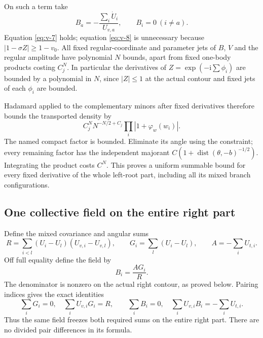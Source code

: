 \documentclass[11pt]{article}
\numberwithin{equation}{section}
\theoremstyle{remark}\newtheorem{remark}[theorem]{Remark}
\newcommand{\ii}{\mathrm i}
\begin{document}
On such a term take
\begin{equation}\label{eq:v-10}
B_a=-\frac{\sum_i\dot U_i}{U_{v,a}},\qquad B_i=0\ (i\ne a).
\end{equation}
Equation \eqref{eq:v-7} holds; equation \eqref{eq:v-8} is unnecessary because
$|1-\sigma Z|\ge1-v_0$. All fixed regular-coordinate and parameter jets of
$B$, $V$ and the regular amplitude have polynomial $N$ bounds, apart
from fixed one-body products costing $C_j^N$. In particular the
derivatives of $Z=\exp(-\ii\sum\phi_i)$ are bounded by a polynomial
in $N$, since $|Z|\le1$ at the actual contour and fixed jets of each
$\phi_i$ are bounded.

Hadamard applied to the complementary minors after fixed derivatives
therefore bounds the transported density by
\begin{equation}\label{eq:v-11}
C_j^N N^{-N/2+C_j}\prod_i |1+\varphi_w(w_i)|.
\end{equation}
The named compact factor is bounded. Eliminate its angle using the
constraint; every remaining factor has the independent majorant
$C(1+\operatorname{dist}(\theta,-b)^{-1/2})$. Integrating the product
costs $C^N$. This proves a uniform summable bound for every fixed
derivative of the whole left-root part, including all its mixed
branch configurations.

\subsection{One collective field on the entire right part}\label{sec:right-field}

Define the mixed covariance and angular sums
\[
 R=\sum_{i<l}(U_i-U_l)(U_{v,i}-U_{v,l}),\qquad
 G_i=\sum_l(U_i-U_l),\qquad A=-\sum_iU_{t,i}.
\]
Off full equality define the field by
\begin{equation}\label{eq:v-12}
 B_i=\frac{A G_i}{R}.
\end{equation}
The denominator is nonzero on the actual right contour, as proved
below. Pairing indices gives the exact identities
\begin{equation}\label{eq:v-13}
 \sum_iG_i=0,\quad \sum_i U_{v,i}G_i=R,\qquad
 \sum_iB_i=0,\quad \sum_iU_{v,i}B_i=-\sum_iU_{t,i}.
\end{equation}
Thus the same field freezes both required sums on the entire right
part. There are no divided pair differences in its formula.
\end{document}
